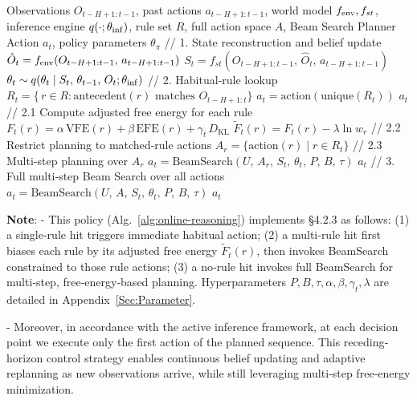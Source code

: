 \documentclass{article} %
\begin{document}
\begin{algorithm}[htbp]
\caption{Active Inference–based Online Reasoning via Rule‐Guided Policy}
\label{alg:online-reasoning}
\begin{algorithmic}[1]
\Require Observations $O_{t-H+1:t-1}$, past actions $a_{t-H+1:t-1}$, world model $f_{\rm env},f_{st}$, inference engine $q(\cdot;\theta_{\rm inf})$, rule set $R$, full action space $A$, Beam Search Planner
\Ensure Action $a_t$, policy parameters $\theta_{\pi}$
%
\State // 1. State reconstruction and belief update  
\State $\hat O_t = f_{\rm env}(O_{t-H+1:t-1},\,a_{t-H+1:t-1})$  
\State $S_t = f_{st}(O_{t-H+1:t-1},\,\hat O_t,\,a_{t-H+1:t-1})$  
\State $\theta_t \sim q(\theta_t \mid S_t,\,\theta_{t-1},\,O_t; \theta_{\rm inf})$
%
\State // 2. Habitual‐rule lookup  
\State $R_t = \{\,r\in R : \mathrm{antecedent}(r)\text{ matches }O_{t-H+1:t}\}$
 
  \State $a_t = \mathrm{action}(\mathrm{unique}(R_t))$
  \State \Return $a_t$
 
  \State // 2.1 Compute adjusted free energy for each rule  
    \State $F_t(r)=\alpha\,\mathrm{VFE}(r)+\beta\,\mathrm{EFE}(r)+\gamma_t\,D_{\mathrm{KL}}$  
    \State $\tilde F_t(r)=F_t(r)-\lambda\ln w_r$
  \EndFor
  \State // 2.2 Restrict planning to matched‐rule actions  
  \State $A_r=\{\mathrm{action}(r)\mid r\in R_t\}$
  \State // 2.3 Multi‐step planning over $A_r$  
  \State $a_t = \mathrm{BeamSearch}(U,\,A_r,\,S_t,\,\theta_t,\,P,\,B,\,\tau)$
  \State \Return $a_t$
\Else {}
  \State // 3. Full multi‐step Beam Search over all actions  
  \State $a_t = \mathrm{BeamSearch}(U,\,A,\,S_t,\,\theta_t,\,P,\,B,\,\tau)$
  \State \Return $a_t$
\EndIf
\end{algorithmic}
\end{algorithm}

\noindent\textbf{Note}:  
- This policy (Alg.~\ref{alg:online-reasoning}) implements §4.2.3 as follows:  
(1) a single‐rule hit triggers immediate habitual action;  
(2) a multi‐rule hit first biases each rule by its adjusted free energy $\tilde F_t(r)$, then invokes BeamSearch constrained to those rule actions;  
(3) a no‐rule hit invokes full BeamSearch for multi‐step, free‐energy‐based planning. Hyperparameters $P,B,\tau,\alpha,\beta,\gamma_t,\lambda$ are detailed in Appendix~\ref{Sec:Parameter}. 

- Moreover, in accordance with the active inference framework, at each decision point we execute only the first action of the planned sequence. This receding‐horizon control strategy enables continuous belief updating and adaptive replanning as new observations arrive, while still leveraging multi‐step free‐energy minimization.  
\end{document}
